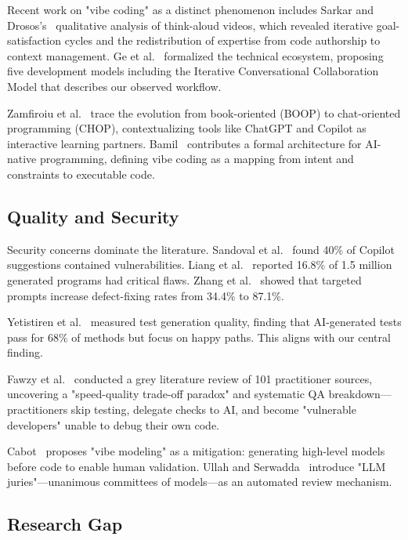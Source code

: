 \documentclass[sigconf]{acmart}
\begin{document}
Recent work on "vibe coding" as a distinct phenomenon includes Sarkar and Drosos's~\cite{sarkar2025vibecoding} qualitative analysis of think-aloud videos, which revealed iterative goal-satisfaction cycles and the redistribution of expertise from code authorship to context management. Ge et al.~\cite{ge2025survey} formalized the technical ecosystem, proposing five development models including the Iterative Conversational Collaboration Model that describes our observed workflow.

Zamfiroiu et al.~\cite{zamfiroiu2025chop} trace the evolution from book-oriented (BOOP) to chat-oriented programming (CHOP), contextualizing tools like ChatGPT and Copilot as interactive learning partners. Bamil~\cite{bamil2025vibecoding} contributes a formal architecture for AI-native programming, defining vibe coding as a mapping from intent and constraints to executable code.

\subsection{Quality and Security}

Security concerns dominate the literature. Sandoval et al.~\cite{sandoval2023lost} found 40\% of Copilot suggestions contained vulnerabilities. Liang et al.~\cite{liang2024empirical} reported 16.8\% of 1.5 million generated programs had critical flaws. Zhang et al.~\cite{zhang2024copilot} showed that targeted prompts increase defect-fixing rates from 34.4\% to 87.1\%.

Yetistiren et al.~\cite{yetistiren2023assessing} measured test generation quality, finding that AI-generated tests pass for 68\% of methods but focus on happy paths. This aligns with our central finding.

Fawzy et al.~\cite{fawzy2026vibecoding} conducted a grey literature review of 101 practitioner sources, uncovering a "speed-quality trade-off paradox" and systematic QA breakdown—practitioners skip testing, delegate checks to AI, and become "vulnerable developers" unable to debug their own code.

Cabot~\cite{cabot2025vibemodeling} proposes "vibe modeling" as a mitigation: generating high-level models before code to enable human validation. Ullah and Serwadda~\cite{ullah2025vibecoding} introduce "LLM juries"—unanimous committees of models—as an automated review mechanism.

\subsection{Research Gap}
\end{document}
